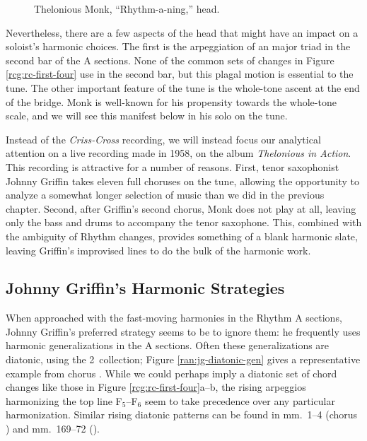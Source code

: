 \begin{figure}[tb]
  \caption{Thelonious Monk, ``Rhythm-a-ning,'' head.}
  \label{ran:head-melody}
\end{figure}

Nevertheless, there are a few aspects of the head that might have an impact on
a soloist's harmonic choices. The first is the arpeggiation of an \Eflat major
triad in the second bar of the A sections. None of the common sets of changes
in Figure \ref{rcg:rc-first-four} use \Eflat in the second bar, but this
plagal motion is essential to the tune.  The other
important feature of the tune is the whole-tone ascent at the end of the
bridge. Monk is well-known for his propensity towards the whole-tone scale,
and we will see this manifest below in his solo on the tune.

Instead of the \emph{Criss-Cross} recording, we will instead focus our
analytical attention on a live recording made in 1958, on the album \emph{Thelonious in
  Action}.\nocite{monk:action} This recording is attractive for a number of
reasons. First, tenor saxophonist Johnny Griffin takes eleven full choruses on
the tune, allowing the opportunity to analyze a somewhat longer selection of
music than we did in the previous chapter. Second, after Griffin's second
chorus, Monk does not play at all, leaving only the bass and drums to
accompany the tenor saxophone. This, combined with the ambiguity of
Rhythm changes, provides something of a blank harmonic slate, leaving
Griffin's improvised lines to do the bulk of the harmonic work.

\subsection{Johnny Griffin’s Harmonic Strategies}
\FloatBarrier

When approached with the fast-moving harmonies in the Rhythm A sections, Johnny
Griffin's preferred strategy seems to be to ignore them: he frequently uses
harmonic generalizations in the A sections. Often these generalizations are
diatonic, using the 2\flat\ collection; Figure \ref{ran:jg-diatonic-gen} gives
a representative example from chorus . While we could perhaps imply
a diatonic set of chord changes like those in Figure
\ref{rcg:rc-first-four}a--b, the rising arpeggios harmonizing the top line
F$_5$--F$_6$ seem to take precedence over any particular harmonization.
Similar rising diatonic patterns can be found in mm.~1--4 (chorus )
and mm.~169--72 ().

